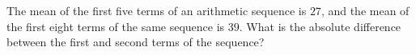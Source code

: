The mean of the first five terms of an arithmetic sequence is $27$, and the mean of the first eight terms of the same sequence is $39$. What is the absolute difference between the first and second terms of the sequence?
